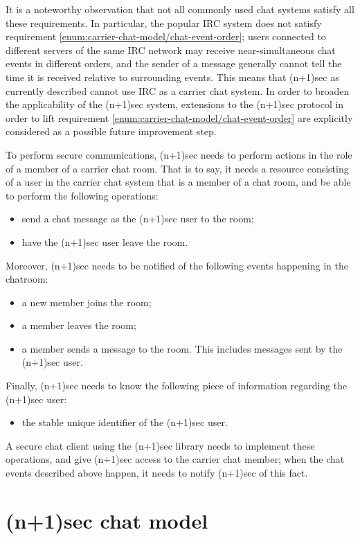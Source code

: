 \documentclass{article}
\begin{document}
It is a noteworthy observation that not all commonly used chat systems satisfy all these requirements.
In particular, the popular IRC system does not satisfy requirement \ref{enum:carrier-chat-model/chat-event-order}; users connected to different servers of the same IRC network may receive near-simultaneous chat events in different orders, and the sender of a message generally cannot tell the time it is received relative to surrounding events.
This means that (n+1)sec as currently described cannot use IRC as a carrier chat system.
In order to broaden the applicability of the (n+1)sec system, extensions to the (n+1)sec protocol in order to lift requirement \ref{enum:carrier-chat-model/chat-event-order} are explicitly considered as a possible future improvement step.

To perform secure communications, (n+1)sec needs to perform actions in the role of a member of a carrier chat room.
That is to say, it needs a resource consisting of a user in the carrier chat system that is a member of a chat room, and be able to perform the following operations:
\begin{itemize}
\item send a chat message as the (n+1)sec user to the room;
\item have the (n+1)sec user leave the room.
\end{itemize}
Moreover, (n+1)sec needs to be notified of the following events happening in the chatroom:
\begin{itemize}
\item a new member joins the room;
\item a member leaves the room;
\item a member sends a message to the room. This includes messages sent by the (n+1)sec user.
\end{itemize}
Finally, (n+1)sec needs to know the following piece of information regarding the (n+1)sec user:
\begin{itemize}
\item the stable unique identifier of the (n+1)sec user.
\end{itemize}

A secure chat client using the (n+1)sec library needs to implement these operations, and give (n+1)sec access to the carrier chat member; when the chat events described above happen, it needs to notify (n+1)sec of this fact.

\section{(n+1)sec chat model}
\label{sec:np1sec-chat-model}
\end{document}
